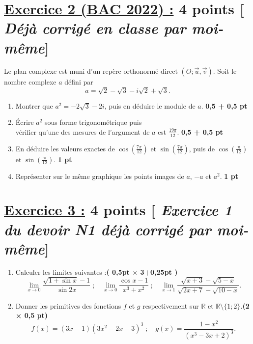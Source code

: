 \documentclass[12pt,a4paper]{article}
\begin{document}
\section*{\underline{Exercice 2 (BAC 2022) :} 4 points [\textit{ Déjà corrigé en classe par moi-même}]}
Le plan complexe est muni d’un repère orthonormé direct $(O; \vec{u}, \vec{v})$. Soit le nombre complexe $a$ défini par 
\[
a = \sqrt{2} - \sqrt{3} - i\sqrt{2} + \sqrt{3}.
\]

\begin{enumerate}
    \item Montrer que $a^2 = -2\sqrt{3} - 2i$, puis en déduire le module de $a$. \hfill \textbf{0,5 + 0,5 pt}

    \item Écrire $a^2$ sous forme trigonométrique puis \\vérifier qu’une des mesures de l’argument de $a$ est $\frac{19\pi}{12}$. \hfill \textbf{0,5 + 0,5 pt}

    \item En déduire les valeurs exactes de $\cos\left(\frac{7\pi}{12}\right)$ et $\sin\left(\frac{7\pi}{12}\right)$, puis de $\cos\left(\frac{\pi}{12}\right)$ et $\sin\left(\frac{\pi}{12}\right)$. \hfill \textbf{1 pt}

    \item Représenter sur le même graphique les points images de $a$, $-a$ et $a^2$. \hfill \textbf{1 pt}
\end{enumerate}
\section*{\underline{Exercice 3 :} 4 points [\textit{ Exercice 1  du devoir N1 déjà  corrigé par moi-même}]}

\begin{enumerate}
    \item Calculer les limites suivantes :\hfill \textbf{( 0,5pt $\times$ 3+0,25pt )}
    \[
    \lim_{x \to 0} \frac{\sqrt{1+\sin x} - 1}{\sin 2x} \; ; \quad
    \lim_{x \to 0} \frac{\cos x - 1}{x^3 + x^2} \; ; \quad
    \lim_{x \to 1} \frac{\sqrt{x + 3} - \sqrt{5 - x}}{\sqrt{2x + 7} - \sqrt{10 - x}}.
    \]
    \item Donner les primitives des fonctions \(f\) et \(g\) respectivement sur \(\mathbb{R}\) et \(\mathbb{R} \setminus \{1; 2\}\).\hfill \textbf{(2 × 0,5 pt)}
    \[
    f(x) = (3x-1)(3x^2-2x+3)^3 \; ; \quad
    g(x) = \frac{1-x^2}{(x^3-3x+2)^3}.
    \]
\end{enumerate}
\end{document}
